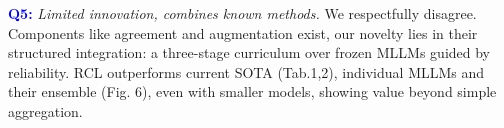 \documentclass[10pt,twocolumn,letterpaper]{article}
\begin{document}

\textcolor{blue}{\textbf{Q5:}} \textit{Limited innovation, combines known methods.}
We respectfully disagree. Components like agreement and augmentation exist, our novelty lies in their structured integration: a three-stage curriculum over frozen MLLMs guided by reliability. RCL outperforms current SOTA (Tab.1,2), individual MLLMs and their ensemble (Fig. 6), even with smaller models, showing value beyond simple aggregation.

%     
%     
\end{document}
